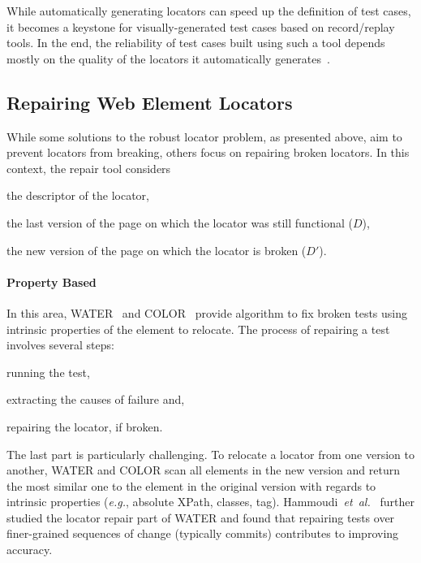 While automatically generating locators can speed up the
definition of test cases, it becomes a keystone for visually-generated test
cases based on record/replay tools. In the end, the reliability of test cases
built using such a tool depends mostly on the quality of the locators it
automatically generates~\cite{hammoudi2016record}.


\subsection{Repairing Web Element Locators}
While some solutions to the robust locator problem, as presented above, aim to prevent locators from breaking, others focus on repairing broken locators.
In this context, the repair tool considers
\begin{inparaenum}[\em a)]
    \item the descriptor of the locator,
    \item the last version of the page on which the locator was still functional ($D$),
    \item the new version of the page on which the locator is broken ($D'$).
\end{inparaenum}

\paragraph{Property Based}
In this area, WATER~\cite{choudhary2011water} and COLOR~\cite{kirinuki2019color}
provide algorithm to fix broken tests using intrinsic properties of the element
to relocate.
The process of repairing a test involves several steps: 
\begin{inparaenum}
\item running the test, 
\item extracting the causes of failure and,
\item repairing the locator, if broken. 
\end{inparaenum}
The last part is particularly challenging. 
To relocate a locator from one version to another, WATER and COLOR scan all elements in the new version and return the most similar one to the element in the original version with regards to intrinsic properties (\emph{e.g.}, absolute XPath, classes, tag).
Hammoudi~\emph{et~al.}~\cite{hammoudi2016waterfall} further studied the locator repair part of WATER and found that repairing tests over finer-grained sequences of change (typically commits) contributes to improving accuracy.


